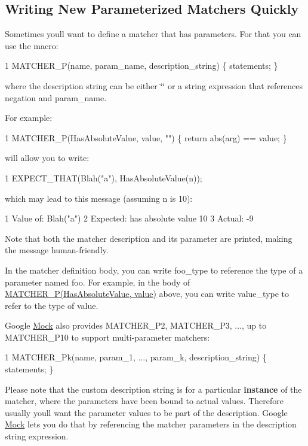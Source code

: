 \subsection*{Writing New Parameterized Matchers Quickly}

Sometimes you\textquotesingle{}ll want to define a matcher that has parameters. For that you can use the macro\+: 
\begin{DoxyCode}
1 MATCHER\_P(name, param\_name, description\_string) \{ statements; \}
\end{DoxyCode}
 where the description string can be either {\ttfamily \char`\"{}\char`\"{}} or a string expression that references {\ttfamily negation} and {\ttfamily param\+\_\+name}.

For example\+: 
\begin{DoxyCode}
1 MATCHER\_P(HasAbsoluteValue, value, "") \{ return abs(arg) == value; \}
\end{DoxyCode}
 will allow you to write\+: 
\begin{DoxyCode}
1 EXPECT\_THAT(Blah("a"), HasAbsoluteValue(n));
\end{DoxyCode}
 which may lead to this message (assuming {\ttfamily n} is 10)\+: 
\begin{DoxyCode}
1 Value of: Blah("a")
2 Expected: has absolute value 10
3   Actual: -9
\end{DoxyCode}


Note that both the matcher description and its parameter are printed, making the message human-\/friendly.

In the matcher definition body, you can write {\ttfamily foo\+\_\+type} to reference the type of a parameter named {\ttfamily foo}. For example, in the body of {\ttfamily \hyperlink{gmock-generated-matchers_8h_acb7ae915efa2fd8d3f6ea7313198afb6}{M\+A\+T\+C\+H\+E\+R\+\_\+\+P(\+Has\+Absolute\+Value, value)}} above, you can write {\ttfamily value\+\_\+type} to refer to the type of {\ttfamily value}.

Google \hyperlink{classMock}{Mock} also provides {\ttfamily M\+A\+T\+C\+H\+E\+R\+\_\+\+P2}, {\ttfamily M\+A\+T\+C\+H\+E\+R\+\_\+\+P3}, ..., up to {\ttfamily M\+A\+T\+C\+H\+E\+R\+\_\+\+P10} to support multi-\/parameter matchers\+: 
\begin{DoxyCode}
1 MATCHER\_Pk(name, param\_1, ..., param\_k, description\_string) \{ statements; \}
\end{DoxyCode}


Please note that the custom description string is for a particular {\bfseries instance} of the matcher, where the parameters have been bound to actual values. Therefore usually you\textquotesingle{}ll want the parameter values to be part of the description. Google \hyperlink{classMock}{Mock} lets you do that by referencing the matcher parameters in the description string expression.

